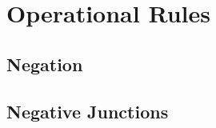 \begin{prooftree}
\end{prooftree}
\quad
\begin{prooftree}
\end{prooftree}
\quad
\begin{prooftree}
\end{prooftree}
\quad
\begin{prooftree}
\end{prooftree}

\section{Operational Rules}
\subsection{Negation}

\begin{prooftree}
\end{prooftree}
\quad
\begin{prooftree}
\end{prooftree}


\subsection{Negative Junctions}

\begin{prooftree}
\end{prooftree}
\quad
\begin{prooftree}
\end{prooftree}
\quad
\begin{prooftree}
\end{prooftree}


\begin{prooftree}
\end{prooftree}
\quad
\begin{prooftree}
\end{prooftree}
\quad
\begin{prooftree}
\end{prooftree}


